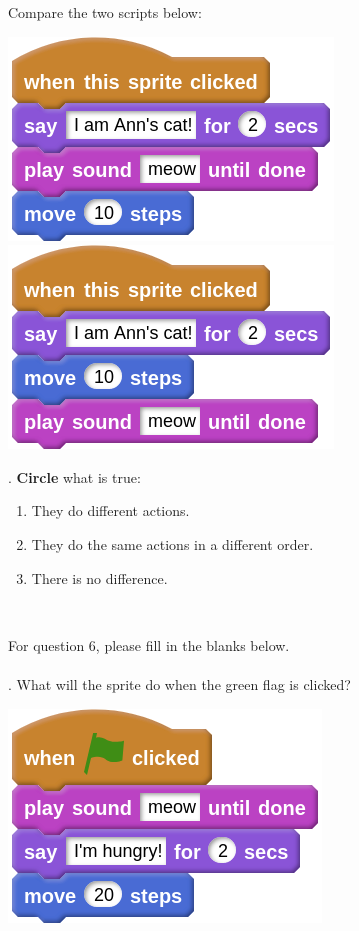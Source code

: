 \documentclass[letterpaper,12pt]{article}
\begin{document}
\noindent Compare the two scripts below:
\begin{center}
\includegraphics[scale=.7,valign=t]{q5_script0.png} \hspace{0.5in}
\includegraphics[scale=.7,valign=t]{q5_script1.png}
\end{center}

. \textbf{Circle} what is true:
\renewcommand{\theenumi}{\Alph{enumi}}
\begin{enumerate}
\item They do different actions. 
\item They do the same actions in a different order.
\item There is no difference.
\end{enumerate}
\noindent \dotfill \\

\newpage

\noindent For question 6, please fill in the blanks below. \\ \\
. What will the sprite do when the green flag is clicked?
\begin{center}
\includegraphics[scale=.7]{q6_script0.png}
\end{center}
\end{document}
